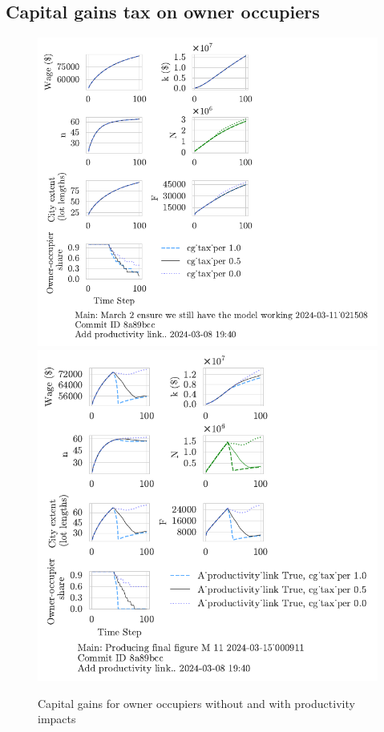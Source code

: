 \subsection{Capital gains tax on owner occupiers}
\begin{figure}[h!tb] 
    \centering
    \includegraphics[scale=.75, trim={0 1.4cm 4.5cm 0},clip]{fig/cg_tax_per-Main-021508.pdf} 
    \includegraphics[scale=.75, trim={0 1.4cm 3.5cm 0},clip]{fig/With-productivity_link_cg_tax_per-000911.pdf} 
    \caption{Capital gains for owner occupiers without and with productivity impacts}
    \label{fig:CG-pers_link_W-WO-Cost-of-capital}
\end{figure}

